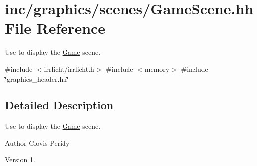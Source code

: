 \hypertarget{GameScene_8hh}{}\section{inc/graphics/scenes/\+Game\+Scene.hh File Reference}
\label{GameScene_8hh}


Use to display the \hyperlink{classGame}{Game} scene.  


{\ttfamily \#include $<$irrlicht/irrlicht.\+h$>$}\newline
{\ttfamily \#include $<$memory$>$}\newline
{\ttfamily \#include \char`\"{}graphics\+\_\+header.\+hh\char`\"{}}\newline


\subsection{Detailed Description}
Use to display the \hyperlink{classGame}{Game} scene. 

\begin{DoxyAuthor}{Author}
Clovis Peridy 
\end{DoxyAuthor}
\begin{DoxyVersion}{Version}
1. 
\end{DoxyVersion}
